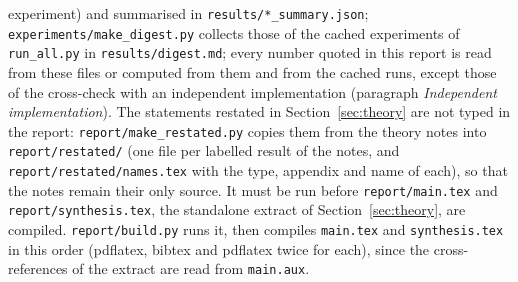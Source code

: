 experiment) and summarised in \nolinkurl{results/*_summary.json}; \nolinkurl{experiments/make_digest.py} collects those
of the cached experiments of \nolinkurl{run_all.py} in \nolinkurl{results/digest.md}; every number quoted in this report is
read from these files or computed from them and from the cached runs, except those of the cross-check with an
independent implementation (paragraph \emph{Independent implementation}). The statements restated in
Section~\ref{sec:theory} are not typed in the report: \nolinkurl{report/make_restated.py} copies them from the theory
notes into \nolinkurl{report/restated/} (one file per labelled result of the notes, and
\nolinkurl{report/restated/names.tex} with the type, appendix and name of each), so that the notes remain their only
source. It must be run before \nolinkurl{report/main.tex} and \nolinkurl{report/synthesis.tex}, the standalone extract
of Section~\ref{sec:theory}, are compiled. \nolinkurl{report/build.py} runs it, then compiles \nolinkurl{main.tex} and
\nolinkurl{synthesis.tex} in this order (pdflatex, bibtex and pdflatex twice for each), since the cross-references of
the extract are read from \nolinkurl{main.aux}.

